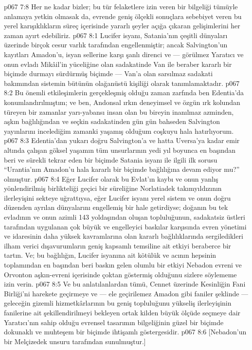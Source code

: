 \vs p067 7:8 Her ne kadar bizler; bu tür felaketlere izin veren bir bilgeliği tümüyle anlamaya yetkin olmasak da, evrende geniş ölçekli sonuçlara sebebiyet veren bu yerel karışıklıkların süreç içerisinde yararlı şeyler açığa çıkaran gelişimlerini her zaman ayırt edebiliriz.
\vs p067 8:1 Lucifer isyanı, Satania’nın çeşitli dünyaları üzerinde birçok cesur varlık tarafından engellenmiştir; ancak Salvington’un kayıtları Amadon’u, isyan sellerine karşı şanlı direnci ve --- görülmez Yaratıcı ve onun evladı Mikâil’in yüceliğine olan sadakatinde Van ile beraber kararlı bir biçimde durmayı sürdürmüş biçimde --- Van’a olan sarsılmaz sadakati bakımından sistemin bütünün olağanüstü kişiliği olarak tanımlamaktadır.
\vs p067 8:2 Bu önemli etkileşimlerin gerçekleşmiş olduğu zaman zarfında ben Edentia’da konumlandırılmıştım; ve ben, Andonsal ırkın deneyimsel ve özgün ırk kolundan türeyen bir zamanlar yarı\hyp{}yabansı insan olan bu bireyin inanılmaz azminden, aşkın bağlılığından ve seçkin sadakatinden gün gün bahseden Salvington yayınlarını incelediğim zamanki yaşamış olduğum coşkuyu hala hatırlıyorum.
\vs p067 8:3 Edentia’dan yukarı doğru Salvington’a ve hatta Uversa’ya kadar emir altında çalışan göksel yaşamın tüm unsurlarının yedi yıl boyunca en başından beri ve sürekli tekrar eden bir biçimde Satania isyanı ile ilgili ilk sorusu “Urantia’nın Amadon’u hala kararlı bir biçimde bağlılığına devam ediyor mu?” olmuştur.
\vs p067 8:4 Eğer Lucifer olarak bu Evlat’ın kaybı ve onun yanlış yönlendirilmiş birlikteliği geçici bir süreliğine Norlatiadek takımyıldızının ilerleyişini sekteye uğrattıysa, eğer Lucifer isyanı yerel sistem ve onun doğru düzenden ayrılan dünyalarını engellemiş bir hale getirdiyse; doğanın bu tek evladının ve onun azimli 143 yoldaşından oluşan topluluğunun, sadakatsiz üstleri tarafından uygulanan çok büyük ve engelleyici baskılar karşısında evren yönetimi ve idaresinin daha yüksek kavramlarına olan kararlı bağlılıklarında sergiledikleri ilham verici dışavurumların geniş kapsamlı temsiline ait etkiyi beraberce bir tartın. Ve; bu bağlılığın, Lucifer isyanına ait kötülük ve acının hepsinin toplamından en başından beri baskın gelen olumlu bir etkiyi Nebadon evreni ve Orvonton aşkın\hyp{}evreni içerisinde çoktan göstermiş olduğunu sizlere söylememe izin verin.
\vs p067 8:5 Ve bu anlatılanlardan tümü, Cennet üzerinde Kesinliğin Fani Birliği’ni harekete geçirmeye ve --- ele geçirilemez Amadon gibi faniler şeklinde --- geleceğin gizemli hizmetkârlarının bu geniş topluluğunu yükseliş ilerleyişinin fanilerine ait şekillendirilmeyi bekleyen ortak kilden büyük ölçüde seçmeye dair Yaratıcı’nın sahip olduğu evrensel tasarımın bilgeliğinin güzel bir biçimde dokunaklı ve muhteşem bir biçimde ihtişamlı göstergesidir.
\vs p067 8:6 [Nebadon’un bir Melçizedek unsuru tarafından sunulmuştur.]
